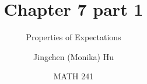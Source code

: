 \documentclass[slidestop,compress,mathserif]{beamer}
\title[Chapter 7 part 1]{Chapter 7 part 1}
\subtitle{Properties of Expectations}
\author[Jingchen (Monika) Hu] %
{Jingchen (Monika) Hu}
\institute[Vassar] %
{Vassar College}
\date[MATH 241] %
{MATH 241}
\begin{document}




\begin{frame}%
\titlepage
\end{frame}


%
%
%
%
%
%
%
%
%
%
%
\end{document}

